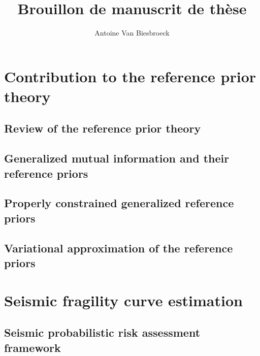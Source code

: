 \documentclass[a4paper]{book}
\title{Brouillon de manuscrit de thèse}
\author{Antoine Van Biesbroeck}
\begin{document}
\maketitle

\tableofcontents








\part{Contribution to the reference prior theory}


\chapter{Review of the reference prior theory}




\chapter{Generalized mutual information and their reference priors}




\chapter{Properly constrained generalized reference priors}




\chapter{Variational approximation of the reference priors}




\part{Seismic fragility curve estimation}


\chapter{Seismic probabilistic risk assessment framework}
\end{document}
